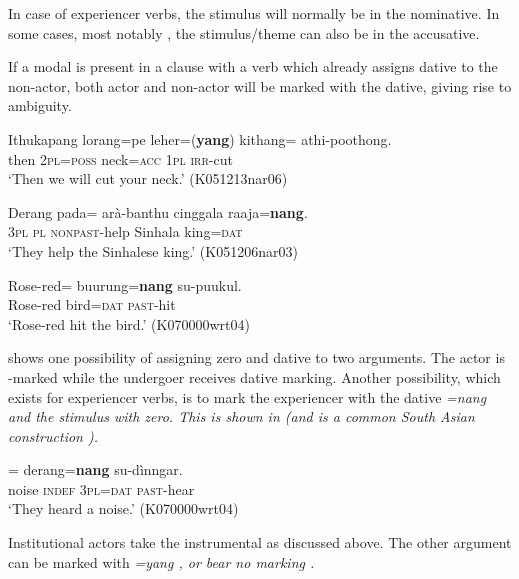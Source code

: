 In case of experiencer verbs, the stimulus will normally be in the nominative.
In some cases, most notably , the stimulus/theme can also be in the accusative.

If a modal is present in a clause with a verb which already assigns dative to the non-actor, both actor and non-actor will be marked with the dative, giving rise to ambiguity.




\ea \label{ex:pred:argstr:2:zeroacc}
\gll  Ithukapang       lorang=pe     leher=(\textbf{yang})   kithang=\zero{} athi-poothong. \\
      then 2\textsc{pl}=\textsc{poss} neck=\textsc{acc} 1\textsc{pl} \textsc{irr}-cut \\
    `Then we will cut your neck.' (K051213nar06)
\z




\ea\label{ex:pred:argstr:2:zerodat:banthu}
\gll Derang pada=\zero{} arà-banthu cinggala  raaja=\textbf{nang}. \\
     3\textsc{pl} \textsc{pl} \textsc{nonpast}-help Sinhala king=\textsc{dat}  \\
    `They help the Sinhalese king.' (K051206nar03)
\z



\ea \label{ex:pred:argstr:2:zerodat:puukul}
\gll   Rose-red=\zero{} buurung=\textbf{nang}   su-puukul. \\
      Rose-red bird=\textsc{dat} \textsc{past}-hit \\
    `Rose-red hit the bird.' (K070000wrt04)
\z


 shows one possibility of assigning zero and dative to two arguments. The actor is \zero-marked while the undergoer receives dative marking. Another possibility, which exists for experiencer verbs, is to mark the experiencer  with the dative \em =nang \em and the stimulus  with zero. This is shown in  (and is a common South Asian construction  \citep[159ff]{Masica1976}).



\ea \label{ex:pred:argstr:2:zerodat:dinggar}
=\zero{}  derang=\textbf{nang}   su-dìnngar. \\
     noise \textsc{indef} 3\textsc{pl}=\textsc{dat} \textsc{past}-hear  \\
    `They heard a noise.' (K070000wrt04)
\z


Institutional actors take the instrumental as discussed above. The other argument can be marked with \em =yang \em {}, or bear no marking .

